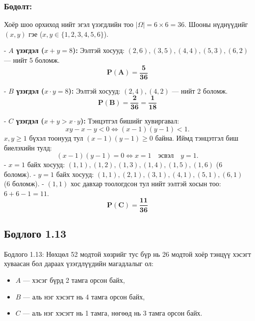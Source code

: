\documentclass[11pt,a4paper]{article}
\begin{document}
\subsubsection*{Бодолт:}

Хоёр шоо орхиход нийт эгэл үзэгдлийн тоо $|\Omega| = 6 \times 6 = 36$. Шооны нүднүүдийг $(x, y)$ гэе ($x, y \in \{1, 2, 3, 4, 5, 6\}$).

- 				\textbf{$A$ үзэгдэл ($x + y = 8$):}
  Ээлтэй хосууд: $(2,6), (3,5), (4,4), (5,3), (6,2)$ — нийт 5 боломж.
  \[
    \mathbf{P(A) = \frac{5}{36}}
  \]

- 				\textbf{$B$ үзэгдэл ($x \cdot y = 8$):}
  Ээлтэй хосууд: $(2,4), (4,2)$ — нийт 2 боломж.
  \[
    \mathbf{P(B) = \frac{2}{36} = \frac{1}{18}}
  \]

- 				\textbf{$C$ үзэгдэл ($x + y > x \cdot y$):}
  Тэнцэтгэл бишийг хувиргавал:
  \[
    xy - x - y < 0 \iff (x - 1)(y - 1) < 1.
  \]
  $x, y \ge 1$ бүхэл тоонууд тул $(x-1)(y-1) \ge 0$ байна. Иймд тэнцэтгэл биш биелэхийн тулд:
  \[
    (x - 1)(y - 1) = 0 \iff x = 1 \quad \text{эсвэл} \quad y = 1.
  \]
  - $x = 1$ байх хосууд: $(1,1), (1,2), (1,3), (1,4), (1,5), (1,6)$ (6 боломж).
  - $y = 1$ байх хосууд: $(1,1), (2,1), (3,1), (4,1), (5,1), (6,1)$ (6 боломж).
  - $(1,1)$ хос давхар тоологдсон тул нийт ээлтэй хосын тоо: $6 + 6 - 1 = 11$.
  \[
    \mathbf{P(C) = \frac{11}{36}}
  \]

\vspace{0.8em}

\subsection*{Бодлого 1.13}

\begin{problembox}{Бодлого 1.13: Нөхцөл}
52 модтой хөзрийг тус бүр нь 26 модтой хоёр тэнцүү хэсэгт хуваасан бол дараах үзэгдлүүдийн магадлалыг ол:
\begin{itemize}[leftmargin=1.8em, itemsep=1pt]
  \item $A$ — хэсэг бүрд 2 тамга орсон байх,
  \item $B$ — аль нэг хэсэгт нь 4 тамга орсон байх,
  \item $C$ — аль нэг хэсэгт нь 1 тамга, нөгөөд нь 3 тамга орсон байх.
\end{itemize}
\end{problembox}
\end{document}
